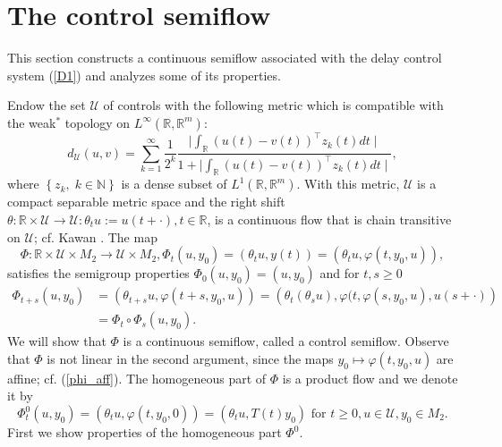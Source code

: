 \documentclass{siamltex}%
\begin{document}
\section{The control semiflow\label{Section4}}

This section constructs a continuous semiflow associated with the delay
control system (\ref{D1}) and analyzes some of its properties.

Endow the set $\mathcal{U}$ of controls with the following metric which is
compatible with the weak$^{\ast}$ topology on $L^{\infty}(\mathbb{R}%
,\mathbb{R}^{m})$:
\begin{equation}
d_{\mathcal{U}}(u,v)=\sum_{k=1}^{\infty}\frac{1}{2^{k}}\frac{\mid
\int_{\mathbb{R}}\left(  u(t)-v(t)\right)  ^{\top}z_{k}(t)dt\mid}{1+\mid
\int_{\mathbb{R}}\left(  u(t)-v(t)\right)  ^{\top}z_{k}(t)dt\mid},
\label{metric on U}%
\end{equation}
where $\left\{  z_{k},\;k\in\mathbb{N}\right\}  $ is a dense subset of
$L^{1}(\mathbb{R}\mathbf{,}\mathbb{R}^{m}).$ With this metric, $\mathcal{U}$
is a compact separable metric space and the right shift $\theta:\mathbb{R}%
\times\mathcal{U}\rightarrow\mathcal{U}:\theta_{t}u:=u(t+\cdot),t\in
\mathbb{R}$, is a continuous flow that is chain transitive on $\mathcal{U}$;
cf. Kawan \cite[Proposition 1.9]{Kawan13}. The map
\begin{equation}
\Phi:\mathbb{R}\times\mathcal{U}\times M_{2}\rightarrow\mathcal{U}\times
M_{2},\Phi_{t}\left(  u,y_{0}\right)  =\left(  \theta_{t}u,y(t)\right)
=\left(  \theta_{t}u,\varphi(t,y_{0},u)\right)  , \label{phi}%
\end{equation}
satisfies the semigroup properties $\Phi_{0}\left(  u,y_{0}\right)  =\left(
u,y_{0}\right)  $ and for $t,s\geq0$%
\begin{align*}
\Phi_{t+s}\left(  u,y_{0}\right)   &  =\left(  \theta_{t+s}u,\varphi
(t+s,y_{0},u)\right)  =\left(  \theta_{t}(\theta_{s}u),\varphi(t,\varphi
(s,y_{0},u),u(s+\cdot)\right) \\
&  =\Phi_{t}\circ\Phi_{s}\left(  u,y_{0}\right)  .
\end{align*}
We will show that $\Phi$ is a continuous semiflow, called a control semiflow.
Observe that $\Phi$ is not linear in the second argument, since the maps
$y_{0}\mapsto\varphi(t,y_{0},u)$ are affine; cf. (\ref{phi_aff}). The
homogeneous part of $\Phi$ is a product flow and we denote it by%
\begin{equation}
\Phi_{t}^{0}(u,y_{0})=(\theta_{t}u,\varphi(t,y_{0},0))=(\theta_{t}%
u,T(t)y_{0})\text{ for }t\geq0,u\in\mathcal{U},y_{0}\in M_{2}. \label{phi_0}%
\end{equation}
First we show properties of the homogeneous part $\Phi^{0}$.
\end{document}
